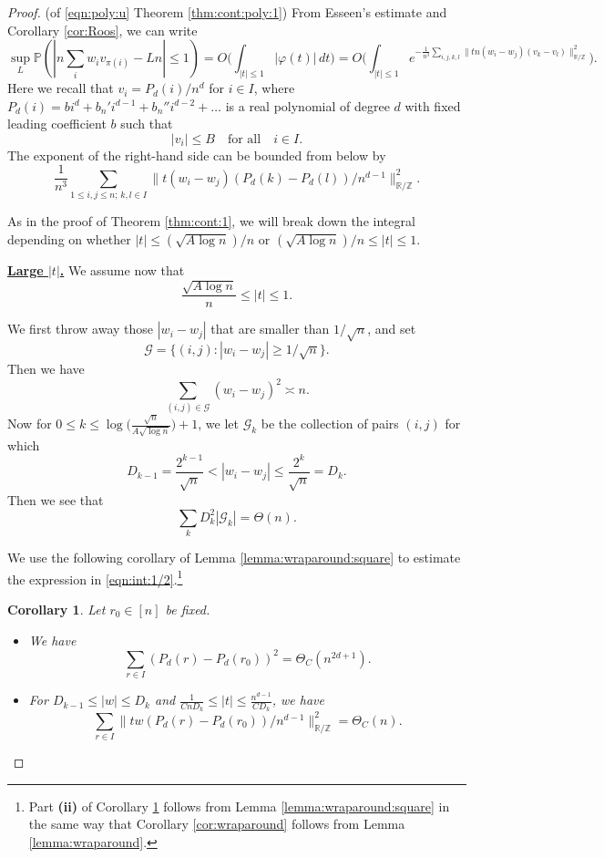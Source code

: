 \documentclass[reqno]{amsart}
\newcommand\R{{\mathbb{R}}}
\newcommand\Z{{\mathbb{Z}}}
\renewcommand\P{{\mathbb{P}}}
\newcommand\CG{{\mathcal G}}
\theoremstyle{plain}
\newtheorem{corollary}[theorem]{Corollary}
\theoremstyle{definition}
\begin{document}
\begin{proof}(of \eqref{eqn:poly:u} Theorem \ref{thm:cont:poly:1}) From Esseen's estimate and Corollary \ref{cor:Roos}, we can write
\[
\sup_{L} \P(|n\sum_{i} w_{i} v_{\pi(i)} -Ln| \le 1) =O\Big(\int_{|t| \le 1} |\varphi(t)|\, dt\Big)=O\Big(\int_{|t| \le 1} e^{- \frac{1}{n^{3}} \sum_{i,j,k,l} \|t n (w_{i}-w_{j}) (v_{k}-v_{l})\|_{\R/\Z}^{2}}\Big).
\]
Here we recall that $v_i = P_d(i)/n^{d}$ for  $i \in I$, where $P_{d}(i) = b i^{d} + b_{n}' i^{d-1} +b_{n}'' i^{d-2}+ \dots$ is a real polynomial of degree $d$ with fixed leading coefficient $b$ such that 
\begin{equation}\label{eqn:bound:P_2}
|v_{i}| \le  B \quad \text{for all} \quad i \in I.
\end{equation}
The exponent of the 
right-hand side can be bounded from below by
\begin{equation}\label{eqn:int:1/2}
\frac{1}{n^{3}} \sum_{1\le i,j\le n; \, k,l \in I} \|t (w_{i}-w_{j})(P_{d}(k) - P_{d}(l))/n^{d-1}\|_{\R/\Z}^{2}.
\end{equation}

As in the proof of Theorem \ref{thm:cont:1}, we will break down the integral depending on whether $|t|\le (\sqrt{A\log n})/n$ or  $(\sqrt{A\log n})/n \le  |t| \le 1$.

\underline{\bf  Large $|t|$.} We assume now that 
$$\frac{\sqrt{A\log n}}{n} \le |t| \le 1.$$



 We
 first throw away those $|w_{i}-w_{j}|$ that are smaller than $1/\sqrt{n}$, and set 
$$\CG=\{(i,j): |w_{i}-w_{j}| \ge 1/\sqrt{n}\}.$$
Then we have 
$$\sum_{(i,j)\in \CG} (w_{i}-w_{j})^{2} \asymp n.$$
Now for $0 \le k \le \log\Big( \frac{\sqrt{n}}{A \sqrt{\log n}} \Big)+1$, we let $\CG_{k}$ be the collection of pairs $(i,j)$ for which
$$ D_{k-1}=\frac{2^{k-1}}{\sqrt{n}} <  |w_{i}-w_{j}| \le \frac{2^{k}}{\sqrt{n}} = D_{k}.$$
Then we see that 
\[
\sum_{k} D_{k}^{2} |\CG_{k}| =\Theta(n).
\]

We use the following corollary of Lemma \ref{lemma:wraparound:square} to estimate the expression in \eqref{eqn:int:1/2}.\footnote{Part \textbf{(ii)} of Corollary \ref{cor:bigt:square} follows from Lemma \ref{lemma:wraparound:square} in the same way that Corollary \ref{cor:wraparound} follows from Lemma \ref{lemma:wraparound}.}

\begin{corollary}\label{cor:bigt:square} Let $r_{0} \in [n]$ be fixed.
\begin{itemize}
\item[\textbf{(i)}] We have 
\[
\sum_{r\in I} (P_{d}(r) - P_{d}(r_{0}))^2=\Theta_{C}(n^{2d+1}).
\]
\item[\textbf{(ii)}] For $ D_{k-1} \le |w|  \le D_{k}$ and $\frac{1}{C n D_{k}} \le  |t| \le \frac{n^{d-1}}{CD_{k}}$, we have
$$ \sum_{r\in I} \|t w (P_{d}(r) - P_{d}(r_{0}))/n^{d-1}\|_{\R/\Z}^{2} =\Theta_{C}(n).$$
\end{itemize}
\end{corollary}



\end{proof}
\end{document}
